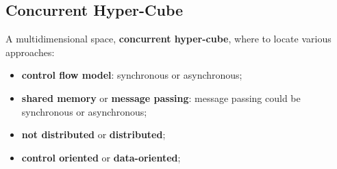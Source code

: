 \subsection{Concurrent Hyper-Cube}\label{sub:ow_concurrent_hyper_cube} %
A multidimensional space, \textbf{concurrent hyper-cube}, where to locate various approaches:
\begin{itemize}
    \item \textbf{control flow model}: synchronous or asynchronous;
    \item \textbf{shared memory} or \textbf{message passing}: message passing could be synchronous or asynchronous;
    \item \textbf{not distributed} or \textbf{distributed};
    \item \textbf{control oriented} or \textbf{data-oriented};
\end{itemize}

